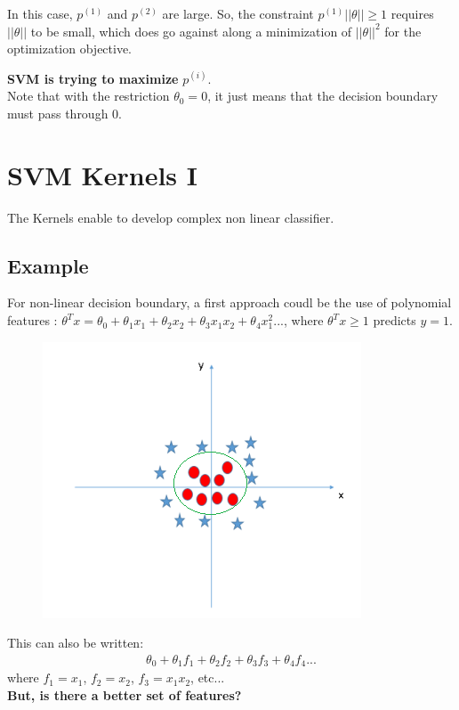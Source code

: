 \documentclass[a4paper,12pt]{report}
\begin{document}
\begin{itemize}
\begin{itemize}
\begin{figure}[H]
\end{figure}
In this case, $p^{(1)}$ and $p^{(2)}$ are large. So, the constraint $p^{(1)} ||\theta|| \geq 1$ requires $||\theta||$ to be small, which does go against along a minimization of $||\theta||^2$ for the optimization objective.
\end{itemize}
\end{itemize}
\textbf{SVM is trying to maximize} $p^{(i)}$.
\\
Note that with the restriction $\theta_0 = 0$, it just means that the decision boundary must pass through 0.



\section{SVM Kernels I}
The Kernels enable to develop complex non linear classifier.
\subsection{Example}
For non-linear decision boundary, a first approach coudl be the use of polynomial features : $\theta^T x = \theta_0 + \theta_1 x_1 + \theta_2 x_2 + \theta_3 x_1 x_2 + \theta_4 x_1 ^2 ... $, where $\theta^T x \geq 1 $ predicts $y=1$.
\begin{figure}[H]
	\centering
        \includegraphics[totalheight=4 cm]{SVM_8.png}\caption{}
\end{figure}
This can also be written:
\begin{align}
\theta_0 + \theta_1 f_1 + \theta_2 f_2 + \theta_3 f_3 + \theta_4 f_4 ...
\end{align}
where $f_1=x_1$, $f_2 = x_2$, $f_3=x_1 x_2$, etc...\\
\textbf{But, is there a better set of features?}\\
\end{document}
